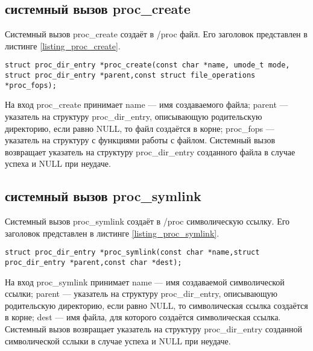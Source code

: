 \subsection{системный вызов proc\_create}

Системный вызов proc\_create создаёт в /proc файл.
Его заголовок представлен в листинге \ref{listing_proc_create}.
\begin{center}
	\begin{lstlisting}[label=listing_proc_create,caption=Заголовок системного вызова proc\_create]
struct proc_dir_entry *proc_create(const char *name, umode_t mode, struct proc_dir_entry *parent,const struct file_operations *proc_fops);
	\end{lstlisting}
\end{center}
На вход proc\_create принимает name --- имя создаваемого файла; parent --- указатель на структуру proc\_dir\_entry, описывающую родительскую директорию, если равно NULL, то файл создаётся в корне; proc\_fops --- указатель на структуру с функциями работы с файлом.
Системный вызов возвращает указатель на структуру proc\_dir\_entry созданного файла в случае успеха и NULL при неудаче.

\subsection{системный вызов proc\_symlink}

Системный вызов proc\_symlink создаёт в /proc символическую ссылку.
Его заголовок представлен в листинге \ref{listing_proc_symlink}.
\begin{center}
	\begin{lstlisting}[label=listing_proc_symlink,caption=Заголовок системного вызова proc\_symlink]
struct proc_dir_entry *proc_symlink(const char *name,struct proc_dir_entry *parent,const char *dest);
	\end{lstlisting}
\end{center}
На вход proc\_symlink принимает name --- имя создаваемой символической ссылки; parent --- указатель на структуру proc\_dir\_entry, описывающую родительскую директорию, если равно NULL, то символическая ссылка создаётся в корне; dest --- имя файла, для которого создаётся символическая ссылка.
Системный вызов возвращает указатель на структуру proc\_dir\_entry созданной символической сслыки в случае успеха и NULL при неудаче.
